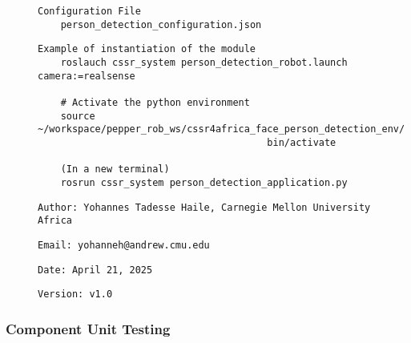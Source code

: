 \documentclass{CSSRforAfrica}
\newcommand{\checkboxChecked}{\fbox{\ding{51}}} %
\begin{document}
\begin{description}
\item[\checkboxChecked] 
 {\small 
\begin{verbatim}
Configuration File
    person_detection_configuration.json
\end{verbatim}}

\item[\checkboxChecked] 
 {\small 
\begin{verbatim}
Example of instantiation of the module
    roslauch cssr_system person_detection_robot.launch camera:=realsense

    # Activate the python environment
    source ~/workspace/pepper_rob_ws/cssr4africa_face_person_detection_env/
    									bin/activate

    (In a new terminal)
    rosrun cssr_system person_detection_application.py
\end{verbatim}}

\item[\checkboxChecked] 
 {\small 
\begin{verbatim}
Author: Yohannes Tadesse Haile, Carnegie Mellon University Africa
\end{verbatim}}

\item[\checkboxChecked] 
 {\small 
\begin{verbatim}
Email: yohanneh@andrew.cmu.edu
\end{verbatim}}

\item[\checkboxChecked] 
 {\small 
\begin{verbatim}
Date: April 21, 2025
\end{verbatim}}

\item[\checkboxChecked] 
 {\small 
\begin{verbatim}
Version: v1.0
\end{verbatim}}


\end{description}

\subsubsection{Component Unit Testing}
\label{subsubsection:person_detection_unit_testing}
\end{document}
